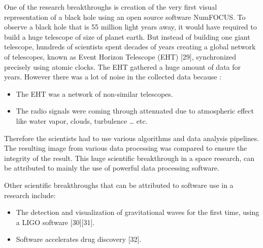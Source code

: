 One of the research breakthroughs is creation of the very first visual representation of a black hole using an open source software NumFOCUS. To observe a black hole that is 55 million light years away, it would have required to build a huge telescope of size of planet earth. But instead of building one giant telescope, hundreds of scientists spent decades of years creating a global network of telescopes, known as Event Horizon Telescope (EHT) [29], synchronized precisely using atomic clocks. The EHT gathered a huge amount of data for years. However there was a lot of noise in the collected data because :
	\vspace{-1mm}   %
	\begin{itemize}[noitemsep,topsep=5pt, leftmargin=0.5in] %
		\item The EHT was a network of non-similar telescopes.
		\item The radio signals were coming through attenuated due to atmospheric effect like water vapor, clouds, turbulence … etc.
	\end{itemize}
Therefore the scientists had to use various algorithms and data analysis pipelines. The resulting image from various data processing was compared to ensure the integrity of the result. This huge scientific breakthrough in a space research, can be attributed to mainly the use of powerful data processing software. 

Other scientific breakthroughs that can be attributed to software use in a research include:

	\vspace{-1mm}   %
	\begin{itemize}[noitemsep,topsep=5pt, leftmargin=0.5in] %
		\item The detection and visualization of gravitational waves for the first time, using a LIGO software [30][31]. 
		\item Software accelerates drug discovery [32].
	\end{itemize}


\clearpage